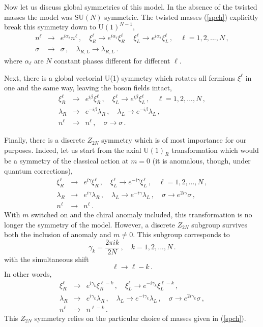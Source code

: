 \documentclass[epsfig,12pt]{article}
\def\beq{\begin{equation}}
\def\eeq{\end{equation}}
\def\beqn{\begin{eqnarray}}
\def\eeqn{\end{eqnarray}}
\def\beqn{\begin{eqnarray}}
\def\eeqn{\end{eqnarray}}
\def\beq{\begin{equation}}
\def\eeq{\end{equation}}
\begin{document}
{Now let us discuss global symmetries of this model. In the absence of the twisted masses
the model was SU$(N)$ symmetric. The twisted masses (\ref{spch}) explicitly break this symmetry down to U$(1)^{N-1}$,
\beqn
n^\ell&\to& e^{i\alpha_\ell}n^\ell\,,\quad \xi^\ell_R \to e^{i\alpha_\ell}\xi^\ell_R\,
\quad \xi^\ell_L \to e^{i\alpha_\ell}\xi^\ell_L\,,\quad \ell=1,2, ..., N\,,
\nonumber\\[2mm]
\sigma
&\to&
 \sigma\,,\quad \lambda_{R,L}\to \lambda_{R,L}\,.
\eeqn
where $\alpha_\ell$ are $N$ constant phases different for different $\ell$. 

Next, there is a global vectorial U(1) symmetry which rotates all fermions $\xi^\ell$
in one and the same way, leaving the boson fields intact,
\beqn
\xi^\ell_R 
&\to& 
e^{i\beta}\xi^\ell_R\,, \quad
 \xi^\ell_L \to e^{i\beta}\xi^\ell_L\,,\quad \ell=1,2, ..., N\,,
\nonumber\\[2mm]
\lambda_R 
&\to&
 e^{-i\beta}\lambda_R\,,\quad 
\lambda_L \to e^{-i\beta}\lambda_L\,,
\nonumber\\[2mm]
n^\ell &\to& n^\ell\,,\quad \sigma\to\sigma\,.
\eeqn

Finally, there is a discrete $Z_{2N}$ symmetry which is of most importance for our purposes.
Indeed, let us start from the axial U$(1)_R$ transformation which would be a symmetry
of the classical action at $m=0$ 
 (it is anomalous, though, under quantum corrections),
\beqn
\xi^\ell_R 
&\to& 
e^{i\gamma}\xi^\ell_R\,, \quad
 \xi^\ell_L \to e^{-i\gamma }\xi^\ell_L\,,\quad \ell=1,2, ..., N\,,
 \nonumber\\[2mm]
 \lambda_R 
&\to&
 e^{i\gamma}\lambda_R\,,\quad 
 \lambda_L \to e^{-i\gamma}\lambda_L\,,\quad \sigma \to e^{2i\gamma}\sigma\,,
\nonumber\\[2mm]
n^\ell
&\to&
 n^\ell\,.
\eeqn
With $m$ switched on and the chiral anomaly included, this transformation 
is no longer the symmetry of the model. However, a discrete $Z_{2N}$ subgroup survives both the inclusion of anomaly and $m\neq 0$. This subgroup corresponds to
\beq
\gamma_k =\frac{2\pi i k}{2N}\,,\quad k= 1,2, ..., N\,.
\eeq
with the simultaneous shift
\beq
\ell\to \ell - k\,.
\eeq
In other words,
\beqn
\xi^\ell_R 
&\to& 
e^{i\gamma_k}\xi^{\ell-k}_R\,, \quad
 \xi^\ell_L \to e^{-i\gamma_k }\xi^{\ell-k}_L\,, 
 \nonumber\\[2mm]
 \lambda_R 
&\to&
 e^{i\gamma_k}\lambda_R\,,\quad 
 \lambda_L \to e^{-i\gamma_k}\lambda_L\,,\quad \sigma \to e^{2i\gamma_k}\sigma\,,
 \nonumber\\[2mm]
 n^\ell &\to & n^{\ell-k}\,.
 \label{bee35}
\eeqn
This $Z_{2N}$ symmetry  relies on the particular choice of masses 
given in (\ref{spch}).

}
\end{document}
